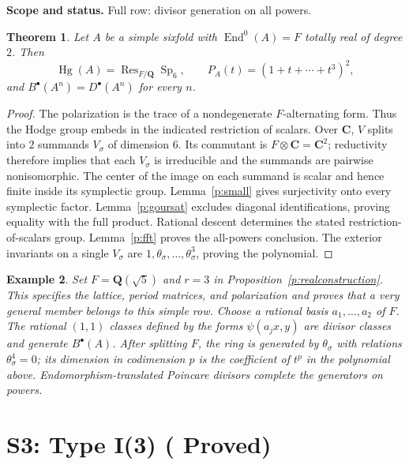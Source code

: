 \documentclass[11pt,reqno]{article}
\theoremstyle{emphasizedplain}
\DeclareRobustCommand{\provedstatus}{%
  \texorpdfstring{\textcolor{ProvedGreen}{\textbf{Proved}}}{Proved}}
\newtheorem{theorem}{Theorem}[section]
\theoremstyle{emphasizeddefinition}
\newtheorem{example}[theorem]{Example}
\theoremstyle{emphasizeddefinition}
\DeclareMathOperator{\End}{End}
\DeclareMathOperator{\Hg}{Hg}
\DeclareMathOperator{\Sp}{Sp}
\DeclareMathOperator{\Res}{Res}
\newcommand{\Q}{\mathbf Q}
\newcommand{\C}{\mathbf C}
\newcommand{\B}{B}
\newcommand{\D}{D}
\newcommand{\status}[1]{%
  \par\nobreak\smallskip\noindent
  {\setlength{\fboxsep}{7pt}%
   \colorbox{ScopeBackground}{%
    \parbox{\dimexpr\linewidth-2\fboxsep\relax}{%
     \small\textbf{\textcolor{HeadingInk}{Scope and status.}} #1}}}%
  \par\nobreak\medskip}
\begin{document}
\status{Full row: divisor generation on all powers.}
\begin{theorem}
Let $A$ be a simple sixfold with $\End^0(A)=F$ totally real of degree $2$.
Then
\[
 \Hg(A)=\Res_{F/\Q}\Sp_{6},\qquad
 P_A(t)=(1+t+\cdots+t^{3})^{2},
\]
and $\B^\bullet(A^n)=\D^\bullet(A^n)$ for every $n$.
\end{theorem}
\begin{proof}
The polarization is the trace of a nondegenerate $F$-alternating form.
Thus the Hodge group embeds in the indicated restriction of scalars.
Over $\C$, $V$ splits into $2$ summands $V_\sigma$ of dimension $6$.
Its commutant is $F\otimes\C=\C^{2}$; reductivity therefore implies that
each $V_\sigma$ is irreducible and the summands are pairwise nonisomorphic.
The center of the image on each summand is scalar and hence finite inside
its symplectic group. Lemma~\ref{p:small} gives surjectivity onto every
symplectic factor. Lemma~\ref{p:goursat} excludes diagonal identifications,
proving equality with the full product. Rational descent determines the
stated restriction-of-scalars group. Lemma~\ref{p:fft} proves the all-powers
conclusion. The exterior invariants on a single $V_\sigma$ are
$1,\theta_\sigma,\ldots,\theta_\sigma^{3}$, proving the polynomial.
\end{proof}
\begin{example}
Set $F=\Q(\sqrt5)$ and $r=3$ in
Proposition~\ref{p:realconstruction}. This specifies the lattice, period
matrices, and polarization and proves that a very general member belongs
to this simple row. Choose a rational basis $a_1,\ldots,a_{2}$ of $F$.
The rational $(1,1)$ classes defined by the forms
$\psi(a_jx,y)$ are divisor classes and generate $\B^\bullet(A)$.
After splitting $F$, the ring is generated by $\theta_\sigma$ with
relations $\theta_\sigma^{4}=0$; its dimension in codimension $p$ is the
coefficient of $t^p$ in the polynomial above. Endomorphism-translated
Poincare divisors complete the generators on powers.
\end{example}
\section{S3: Type I(3) (\provedstatus)}\label{sec:S3}
\end{document}
